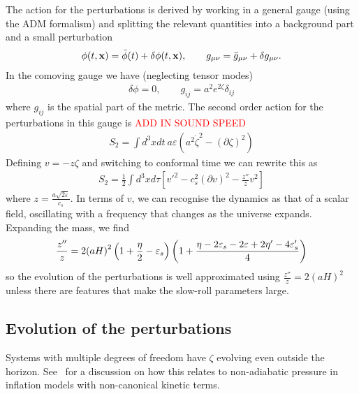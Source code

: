     The action for the perturbations is derived by working in a general gauge
    (using the ADM formalism) and splitting the relevant quantities into a background
    part and a small perturbation
    \begin{align}
        \phi(t,\mathbf{x})=\bar{\phi}(t)+\delta\phi(t,\mathbf{x}), \qquad g_{\mu\nu}=\bar{g}_{\mu\nu}+\delta g_{\mu\nu}.
    \end{align}
    In the comoving gauge we have (neglecting tensor modes)
    \begin{align}
        \delta \phi=0, \qquad g_{ij}=a^2 e^{2\zeta} \delta_{ij}
    \end{align}
    where $g_{ij}$ is the spatial part of the metric.
    The second order action for the perturbations in this gauge is
    \textcolor{red}{ADD IN SOUND SPEED}
    \begin{align}
        S_{2} = \int d^3x dt~a\varepsilon\left(a^2\dot{\zeta}^2-\left(\partial\zeta\right)^2\right)
    \end{align}
    Defining $v=-z\zeta$ and switching to conformal time we can rewrite this as
    \begin{align}
        S_{2} = \frac{1}{2}\int d^3x d\tau \left[v'^2-c_s^2\left(\partial v\right)^2-\frac{z''}{z}v^2\right]
    \end{align}
    where $z=\frac{a\sqrt{2\varepsilon}}{c_s}$.
    In terms of $v$, we can recognise the dynamics as that of a scalar field, oscillating
    with a frequency that changes as the universe expands.
    Expanding the mass, we find
    \begin{align}
        \frac{z''}{z} = 2{\left(aH\right)}^2\left(1+\frac{\eta}{2}-\varepsilon_s\right)\left(1+\frac{\eta-2\varepsilon_{s}-2\varepsilon+2\eta'-4\varepsilon_{s}'}{4}\right)
    \end{align}
    so the evolution of the perturbations is well approximated using $\frac{z''}{z} = 2{\left(aH\right)}^2$
    unless there are features that make the slow-roll parameters large.

    \subsection{Evolution of the perturbations}
    Systems with multiple degrees of freedom have $\zeta$ evolving even outside
    the horizon. See~\cite{Christopherson_2009} for a discussion on how this relates
    to non-adiabatic pressure in inflation models with non-canonical kinetic terms.


